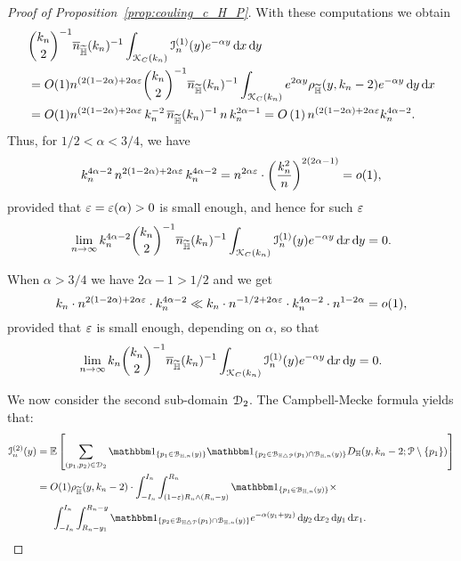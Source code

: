 \begin{proof}[Proof of Proposition~\ref{prop:couling_c_H_P}]
With these computations we obtain
\begin{align*} 
	&\binom{k_n}{2}^{-1} \overline{n}_{\widetilde{\mathbb{H}}}(k_n)^{-1} \int_{{\mathcal K}_{C}(k_n)} \mathcal{I}_n^{(1)}(y) e^{-\alpha y} \operatorname{\mathrm{d}\hspace{-2pt}} x \operatorname{\mathrm{d}\hspace{-2pt}} y\\
	&= O(1) n^{(2(1-2\alpha) + 2\alpha \varepsilon} {k_n \choose 2}^{-1} \overline{n}_{\widetilde{\mathbb{H}}}(k_n)^{-1} 
		\int_{{\mathcal K}_{C}(k_n)} e^{2\alpha y} \rho_{\widetilde{\mathbb{H}}}(y,k_n-2) e^{-\alpha y} \operatorname{\mathrm{d}\hspace{-2pt}} y \operatorname{\mathrm{d}\hspace{-2pt}} x \\ 
	&=O(1) n^{(2(1-2\alpha) + 2\alpha \varepsilon} \, k_n^{-2} \, \overline{n}_{\widetilde{\mathbb{H}}}(k_n)^{-1} \, n \, k_n^{2\alpha - 1}
		=O\left(1\right) n^{(2(1-2\alpha) + 2\alpha \varepsilon} k_n^{4\alpha - 2}.
\end{align*}
Thus, for $1/2 < \alpha < 3/4$, we have 
\begin{equation*}
k_n^{4 \alpha -2} \,  n^{2(1-2\alpha) + 2\alpha \varepsilon} \, k_n^{4\alpha -2} = 
n^{2\alpha \varepsilon} \cdot \left( \frac{k_n^2}{n} \right)^{2(2\alpha -1)} = o(1), 
\end{equation*}
provided that $\varepsilon = \varepsilon (\alpha)>0$ is small enough, and hence for such $\varepsilon$
\[
	\lim_{n \to \infty} k_n^{4\alpha - 2} \binom{k_n}{2}^{-1} \overline{n}_{\widetilde{\mathbb{H}}}(k_n)^{-1} \int_{{\mathcal K}_{C}(k_n)} \mathcal{I}_n^{(1)}(y) e^{-\alpha y} \operatorname{\mathrm{d}\hspace{-2pt}} x \operatorname{\mathrm{d}\hspace{-2pt}} y = 0.
\]

When $\alpha > 3/4$ we have $2\alpha -1 > 1/2$ and we get
\begin{equation*} 
k_n \cdot n^{2(1-2\alpha) + 2\alpha \varepsilon} \cdot k_n^{4\alpha -2}
\ll k_n \cdot n^{-1/2 + 2\alpha \varepsilon}  \cdot k_n^{4\alpha -2} \cdot n^{1-2\alpha}  = o(1),
\end{equation*}
provided that $\varepsilon$ is small enough, depending on $\alpha$, so that
\[
	\lim_{n \to \infty} k_n \binom{k_n}{2}^{-1} \overline{n}_{\widetilde{\mathbb{H}}}(k_n)^{-1} \int_{{\mathcal K}_{C}(k_n)} \mathcal{I}_n^{(1)}(y) e^{-\alpha y} \operatorname{\mathrm{d}\hspace{-2pt}} x \operatorname{\mathrm{d}\hspace{-2pt}} y = 0.
\]


We now consider the second sub-domain $\mathcal{D}_{2}$. The Campbell-Mecke formula yields that: 
\begin{align*}
	\mathcal{I}_n^{(2)}(y) 
	&= \Exp { \sum_{(p_1,p_2)  \in \dom{2}} \ind{p_1 \in \BallHyp{y}} \ind{p_2 \in \BallSym{p_1} \cap \BallHyp{y}}
		D_\H (y,k_n-2;\Pcal \setminus \{ p_1\})} \\
	&= O(1) \rho_{\HP}(y,k_n-2) \cdot \int_{-I_n}^{I_n} \int_{(1-\eps) R_n \wedge (R_n-y)}^{R_n} 
		\ind{p_1 \in \BallHyp{y}} \times \\
	&\hspace{15pt} \int_{-I_n}^{I_n} \int_{R_n - y_1}^{R_n-y} \ind{p_2 \in \BallSym{p_1} \cap \BallHyp{y}}
		e^{-\alpha(y_1 + y_2)} \dd y_2 \dd x_2 \dd y_1 \dd x_1.
\end{align*}


\end{proof}
